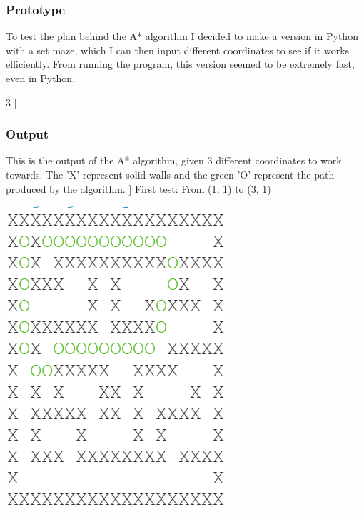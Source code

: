 \documentclass[../Main.tex]{subfiles}
\begin{document}
        \subsubsection{Prototype} %
            To test the plan behind the A* algorithm I decided to make a version in Python with a set maze, which I can then input different coordinates to see if it works efficiently. From running the program, this version seemed to be extremely fast, even in Python.
            
        \begin{multicols*}{3}
            [
                \subsubsection{Output}
                This is the output of the A* algorithm, given 3 different coordinates to work towards. The 'X' represent solid walls and the green 'O' represent the path produced by the algorithm.
            ]
            First test: From (1, 1) to (3, 1) \par
            \centerline{\includegraphics[width=0.8\linewidth]{img/Design/AStarPrototype1.png}}


\end{multicols*}
\end{document}
